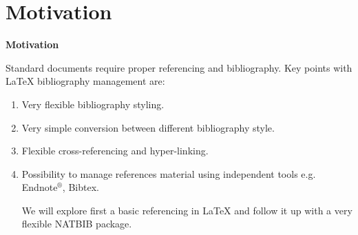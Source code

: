 
\begin{frame}[t,plain]
\titlepage
\end{frame}

\section{Motivation}
\begin{frame}[t]{\textbf{Motivation}}
\vspace{0.2cm}
\justifying

Standard documents require proper referencing and bibliography. Key points with \LaTeX{} bibliography management are:
\vspace{0.2cm}
\begin{enumerate}

\item Very flexible bibliography styling.\\
\vspace{0.2cm}
\item Very simple conversion between different bibliography style.\\
\vspace{0.2cm}
\item Flexible cross-referencing and hyper-linking.\\
\vspace{0.2cm}
\item Possibility to manage references material using independent tools e.g. Endnote$^\circledR$, Bibtex.\\
\vspace{0.2cm}

We will explore first a basic referencing in \LaTeX{} and follow it up with a very flexible NATBIB package. 
\end{enumerate}

\end{frame}

